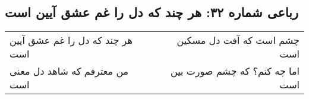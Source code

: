 \begin{center}
\section*{رباعی شماره ۳۲: هر چند که دل را غم عشق آیین است}
\label{sec:032}
\begin{longtable}{l p{0.5cm} r}
هر چند که دل را غم عشق آیین است
&&
چشم است که آفت دل مسکین است
\\
من معترفم که شاهد دل معنی است
&&
اما چه کنم؟ که چشم صورت بین است
\\
\end{longtable}
\end{center}
